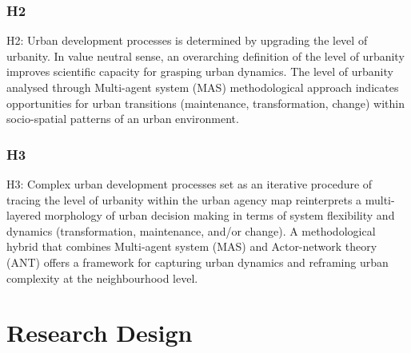 \documentclass[11pt]{report}
\begin{document}
\subsubsection{H2}

H2:  Urban development processes  is  determined  by  upgrading the  level  of  urbanity.  In value neutral sense, an overarching definition of the level of urbanity improves scientific capacity for grasping urban dynamics. The level of urbanity analysed through Multi-agent system (MAS) methodological approach indicates opportunities for urban transitions (maintenance, transformation, change) within socio-spatial patterns of an urban environment. 

\subsubsection{H3}

H3: Complex urban development processes set as an iterative procedure of tracing the level of urbanity within the urban agency map reinterprets a multi-layered morphology of urban decision making in terms of system flexibility and dynamics (transformation, maintenance, and/or change). A methodological hybrid that combines Multi-agent system (MAS) and Actor-network theory (ANT) offers a framework for capturing urban dynamics and reframing urban complexity at the neighbourhood level.

\section{Research Design}
\end{document}
